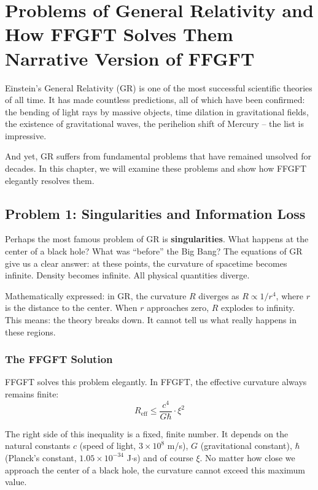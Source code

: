 \chapter{Problems of General Relativity  and How FFGFT Solves Them  Narrative Version of FFGFT}



Einstein's General Relativity (GR) is one of the most successful scientific theories of all time. It has made countless predictions, all of which have been confirmed: the bending of light rays by massive objects, time dilation in gravitational fields, the existence of gravitational waves, the perihelion shift of Mercury -- the list is impressive.

And yet, GR suffers from fundamental problems that have remained unsolved for decades. In this chapter, we will examine these problems and show how FFGFT elegantly resolves them.

\section{Problem 1: Singularities and Information Loss}

Perhaps the most famous problem of GR is \textbf{singularities}. What happens at the center of a black hole? What was ``before'' the Big Bang? The equations of GR give us a clear answer: at these points, the curvature of spacetime becomes infinite. Density becomes infinite. All physical quantities diverge.

Mathematically expressed: in GR, the curvature $R$ diverges as $R \propto 1/r^4$, where $r$ is the distance to the center. When $r$ approaches zero, $R$ explodes to infinity. This means: the theory breaks down. It cannot tell us what really happens in these regions.

\subsection{The FFGFT Solution}

FFGFT solves this problem elegantly. In FFGFT, the effective curvature always remains finite:
\begin{equation}
R_{\text{eff}} \leq \frac{c^4}{G \hbar} \cdot \xi^2
\end{equation}

The right side of this inequality is a fixed, finite number. It depends on the natural constants $c$ (speed of light, $3 \times 10^8$ m/s), $G$ (gravitational constant), $\hbar$ (Planck's constant, $1.05 \times 10^{-34}$ J$\cdot$s) and of course $\xi$. No matter how close we approach the center of a black hole, the curvature cannot exceed this maximum value.

